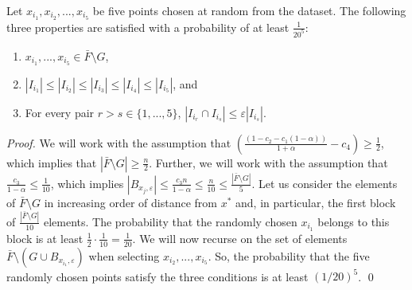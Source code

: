 \documentclass[11pt]{llncs}
\newcommand{\veps}{\varepsilon}
\begin{document}
\begin{lemma}\label{lemma:6}
Let $x_{i_1}, x_{i_2}, ..., x_{i_5}$ be five points chosen at random from the dataset. The following three properties are satisfied with a probability of at least $\frac{1}{20^5}$:
\begin{enumerate}
\item $x_{i_1}, ..., x_{i_5} \in \bar{F} \setminus G$,
\item $|I_{i_1}| \leq |I_{i_2}| \leq |I_{i_3}| \leq |I_{i_4}| \leq |I_{i_5}|$, and
\item For every pair $r > s \in \{1, ..., 5\}$, $|I_{i_r} \cap I_{i_s}| \leq \veps |I_{i_s}|$.
\end{enumerate}
\end{lemma}
\begin{proof}
We will work with the assumption that $\left(\frac{(1 - c_2 - c_1(1-\alpha))}{1+\alpha} - c_4 \right) \geq \frac{1}{2}$, which implies that $|\bar{F}\setminus G| \geq \frac{n}{2}$.
Further, we will work with the assumption that $\frac{c_3}{1-\alpha} \leq \frac{1}{10}$, which implies $|B_{x_{j}, \veps}| \leq \frac{c_3 n}{1-\alpha} \leq \frac{n}{10} \leq \frac{|\bar{F}\setminus G|}{5}$. Let us consider the elements of $\bar{F} \setminus G$ in increasing order of distance from $x^*$ and, in particular, the first block of $\frac{|\bar{F} \setminus G|}{10}$ elements. The probability that the randomly chosen $x_{i_1}$ belongs to this block is at least $\frac{1}{2} \cdot \frac{1}{10} = \frac{1}{20}$. 
We will now recurse on the set of elements $\bar{F} \setminus (G \cup B_{x_{i_1}, \veps})$ when selecting $x_{i_2}, ..., x_{i_5}$. So, the probability that the five randomly chosen points satisfy the three conditions is at least $(1/20)^5$. \qed
\end{proof}
\end{document}
